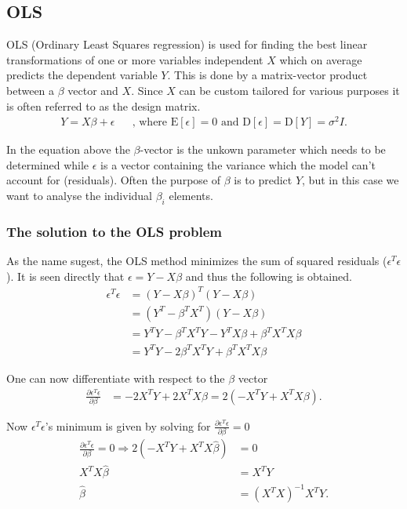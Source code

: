 \subsection{OLS}
OLS (Ordinary Least Squares regression) is used for finding the best linear transformations of one or more variables independent $X$ which on average predicts the dependent variable $Y$.
This is done by a matrix-vector product between a $\beta$ vector and $X$.
Since $X$ can be custom tailored for various purposes it is often referred to as the design matrix.
\begin{align}
Y=X \beta +\epsilon && \text{, where } \mathrm{E}[\epsilon] = 0 \text{ and } \mathrm{D}[\epsilon] = \mathrm{D}[Y] = \sigma^2 I .
\end{align}

In the equation above the $\beta$-vector is the unkown parameter which needs to be determined while  $\epsilon$ is a vector containing the variance which the model can't account for (residuals).
Often the purpose of $\beta$ is to predict $Y$, but in this case we want to analyse the individual $\beta_i$ elements.

\subsubsection{The solution to the OLS problem}
As the name sugest, the OLS method minimizes the sum of squared residuals ($\epsilon^T \epsilon$).
It is seen directly that $\epsilon = Y - X \beta$ and thus the following is obtained.
\begin{equation}
\begin{split}
\epsilon^T\epsilon&=(Y-X\beta)^T (Y-X\beta)\\
&=(Y^T-\beta^T X^T) (Y-X\beta) \\
&=Y^T Y-\beta^T X^T Y-Y^T X \beta + \beta^T X^T X \beta \\
&=Y^T Y- 2\beta^T X^T Y+ \beta^T X^T X \beta
\end{split}
\end{equation}

One can now differentiate with respect to the $\beta$ vector
\begin{equation}
\begin{split}
\frac{\partial \epsilon^T\epsilon}{\partial \beta}&=-2 X^T Y+2X^T X \beta=2(-X^T Y+X^T X \beta).
\end{split}
\end{equation}

Now  $\epsilon^T \epsilon$'s minimum is given by solving for $\frac{\partial \epsilon^T\epsilon}{\partial \beta} = 0$
\begin{equation}
\begin{split}
\frac{\partial \epsilon^T\epsilon}{\partial \beta} = 0 \Rightarrow 2(-X^T Y+X^T X \hat{\beta}) &= 0 \\
X^T X \hat{\beta}&=X^T Y \\
\hat{\beta}&=(X^T X)^{-1} X^T Y.
\end{split}
\end{equation}

